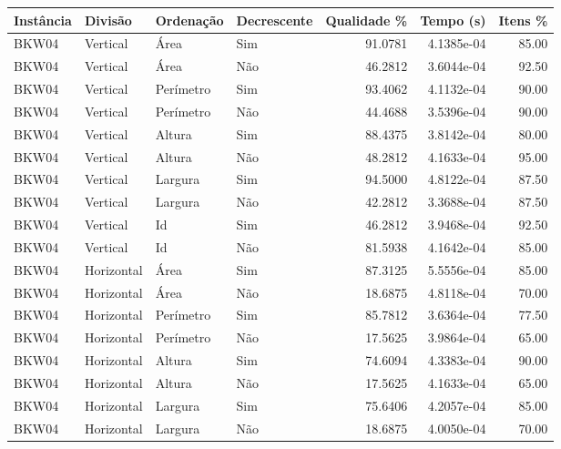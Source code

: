 \begin{tabular}{llllrrr}
    \hline
    Instância & Divisão     & Ordenação & Decrescente & Qualidade \% & Tempo (s)  & Itens \% \\
    \hline
    BKW04     & Vertical    & Área      & Sim         & 91.0781      & 4.1385e-04 & 85.00    \\
    BKW04     & Vertical    & Área      & Não         & 46.2812      & 3.6044e-04 & 92.50    \\
    BKW04     & Vertical    & Perímetro & Sim         & 93.4062      & 4.1132e-04 & 90.00    \\
    BKW04     & Vertical    & Perímetro & Não         & 44.4688      & 3.5396e-04 & 90.00    \\
    BKW04     & Vertical    & Altura    & Sim         & 88.4375      & 3.8142e-04 & 80.00    \\
    BKW04     & Vertical    & Altura    & Não         & 48.2812      & 4.1633e-04 & 95.00    \\
    BKW04     & Vertical    & Largura   & Sim         & 94.5000      & 4.8122e-04 & 87.50    \\
    BKW04     & Vertical    & Largura   & Não         & 42.2812      & 3.3688e-04 & 87.50    \\
    BKW04     & Vertical    & Id        & Sim         & 46.2812      & 3.9468e-04 & 92.50    \\
    BKW04     & Vertical    & Id        & Não         & 81.5938      & 4.1642e-04 & 85.00    \\
    BKW04     & Horizontal  & Área      & Sim         & 87.3125      & 5.5556e-04 & 85.00    \\
    BKW04     & Horizontal  & Área      & Não         & 18.6875      & 4.8118e-04 & 70.00    \\
    BKW04     & Horizontal  & Perímetro & Sim         & 85.7812      & 3.6364e-04 & 77.50    \\
    BKW04     & Horizontal  & Perímetro & Não         & 17.5625      & 3.9864e-04 & 65.00    \\
    BKW04     & Horizontal  & Altura    & Sim         & 74.6094      & 4.3383e-04 & 90.00    \\
    BKW04     & Horizontal  & Altura    & Não         & 17.5625      & 4.1633e-04 & 65.00    \\
    BKW04     & Horizontal  & Largura   & Sim         & 75.6406      & 4.2057e-04 & 85.00    \\
    BKW04     & Horizontal  & Largura   & Não         & 18.6875      & 4.0050e-04 & 70.00    \\

\end{tabular}
